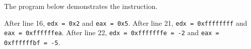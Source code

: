 \documentclass[a4paper]{article}
\begin{document}
The program below demonstrates the instruction.



After line 16, \texttt{edx = 0x2} and \texttt{eax = 0x5}. After line 21, \texttt{edx = 0xffffffff} and \texttt{eax = 0xffffffea}. After line 22, \texttt{edx = 0xfffffffe = -2} and \texttt{eax = 0xffffffbf = -5}.







\newpage
\printbibliography
\end{document}
